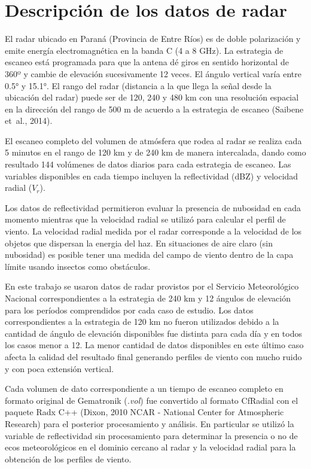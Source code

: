\documentclass[12pt,spanish,oneside, a4paper]{book}
\begin{document}
\section{Descripción de los datos de
radar}\label{descripcion-de-los-datos-de-radar}

El radar ubicado en Paraná (Provincia de Entre Ríos) es de doble
polarización y emite energía electromagnética en la banda C (4 a 8 GHz).
La estrategia de escaneo está programada para que la antena dé giros en
sentido horizontal de 360º y cambie de elevación sucesivamente 12 veces.
El ángulo vertical varía entre 0.5° y 15.1°. El rango del radar
(distancia a la que llega la señal desde la ubicación del radar) puede
ser de 120, 240 y 480 km con una resolución espacial en la dirección del
rango de 500 m de acuerdo a la estrategia de escaneo (Saibene et~al.,
2014).

El escaneo completo del volumen de atmósfera que rodea al radar se
realiza cada 5 minutos en el rango de 120 km y de 240 km de manera
intercalada, dando como resultado 144 volúmenes de datos diarios para
cada estrategia de escaneo. Las variables disponibles en cada tiempo
incluyen la reflectividad (dBZ) y velocidad radial (\(V_r\)).

Los datos de reflectividad permitieron evaluar la presencia de nubosidad
en cada momento mientras que la velocidad radial se utilizó para
calcular el perfil de viento. La velocidad radial medida por el radar
corresponde a la velocidad de los objetos que dispersan la energia del
haz. En situaciones de aire claro (sin nubosidad) es posible tener una
medida del campo de viento dentro de la capa límite usando insectos como
obstáculos.

En este trabajo se usaron datos de radar provistos por el Servicio
Meteorológico Nacional correspondientes a la estrategia de 240 km y 12
ángulos de elevación para los períodos comprendidos por cada caso de
estudio. Los datos correspondientes a la estrategia de 120 km no fueron
utilizados debido a la cantidad de ángulo de elevación disponibles fue
distinta para cada día y en todos los casos menor a 12. La menor
cantidad de datos disponibles en este último caso afecta la calidad del
resultado final generando perfiles de viento con mucho ruido y con poca
extensión vertical.

Cada volumen de dato correspondiente a un tiempo de escaneo completo en
formato original de Gematronik (\emph{.vol}) fue convertido al formato
CfRadial con el paquete Radx C++ (Dixon, 2010 NCAR - National Center for
Atmospheric Research) para el posterior procesamiento y análisis. En
particular se utilizó la variable de reflectividad sin procesamiento
para determinar la presencia o no de ecos meteorológicos en el dominio
cercano al radar y la velocidad radial para la obtención de los perfiles
de viento.
\end{document}
